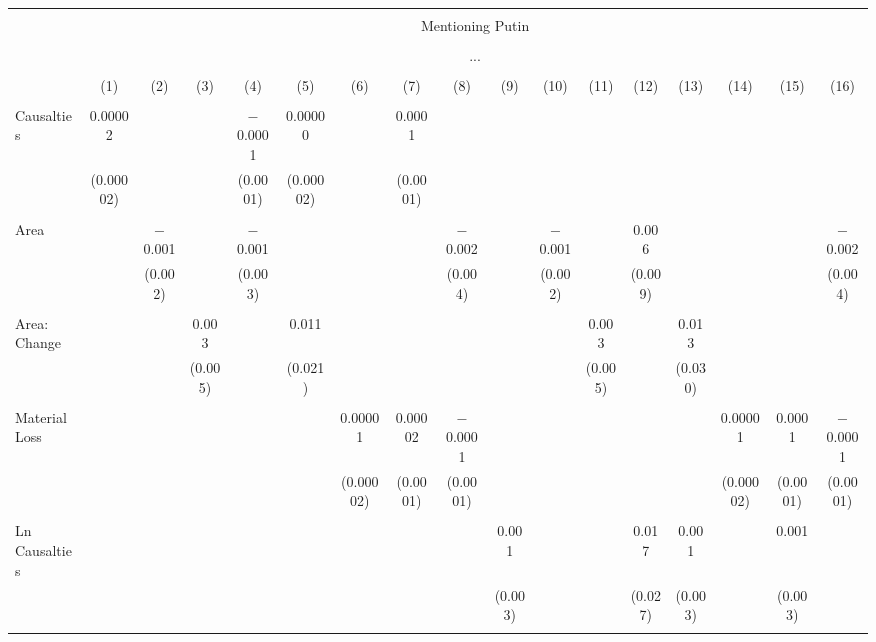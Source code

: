 
\begin{table}[!htbp] \centering 
  \caption{} 
  \label{} 
\begin{tabular}{@{\extracolsep{5pt}}lcccccccccccccccc} 
\\[-1.8ex]\hline 
\hline \\[-1.8ex] 
 & \multicolumn{16}{c}{Mentioning Putin} \\ 
\cline{2-17} 
\\[-1.8ex] & \multicolumn{16}{c}{...} \\ 
\\[-1.8ex] & (1) & (2) & (3) & (4) & (5) & (6) & (7) & (8) & (9) & (10) & (11) & (12) & (13) & (14) & (15) & (16)\\ 
\hline \\[-1.8ex] 
 Causalties & 0.00002 &  &  & $-$0.0001 & 0.00000 &  & 0.0001 &  &  &  &  &  &  &  &  &  \\ 
  & (0.00002) &  &  & (0.0001) & (0.00002) &  & (0.0001) &  &  &  &  &  &  &  &  &  \\ 
  & & & & & & & & & & & & & & & & \\ 
 Area &  & $-$0.001 &  & $-$0.001 &  &  &  & $-$0.002 &  & $-$0.001 &  & 0.006 &  &  &  & $-$0.002 \\ 
  &  & (0.002) &  & (0.003) &  &  &  & (0.004) &  & (0.002) &  & (0.009) &  &  &  & (0.004) \\ 
  & & & & & & & & & & & & & & & & \\ 
 Area: Change &  &  & 0.003 &  & 0.011 &  &  &  &  &  & 0.003 &  & 0.013 &  &  &  \\ 
  &  &  & (0.005) &  & (0.021) &  &  &  &  &  & (0.005) &  & (0.030) &  &  &  \\ 
  & & & & & & & & & & & & & & & & \\ 
 Material Loss &  &  &  &  &  & 0.00001 & 0.00002 & $-$0.0001 &  &  &  &  &  & 0.00001 & 0.0001 & $-$0.0001 \\ 
  &  &  &  &  &  & (0.00002) & (0.0001) & (0.0001) &  &  &  &  &  & (0.00002) & (0.0001) & (0.0001) \\ 
  & & & & & & & & & & & & & & & & \\ 
 Ln Causalties &  &  &  &  &  &  &  &  & 0.001 &  &  & 0.017 & 0.001 &  & 0.001 &  \\ 
  &  &  &  &  &  &  &  &  & (0.003) &  &  & (0.027) & (0.003) &  & (0.003) &  \\ 
  & & & & & & & & & & & & & & & & \\ 

\end{tabular}
\end{table}
